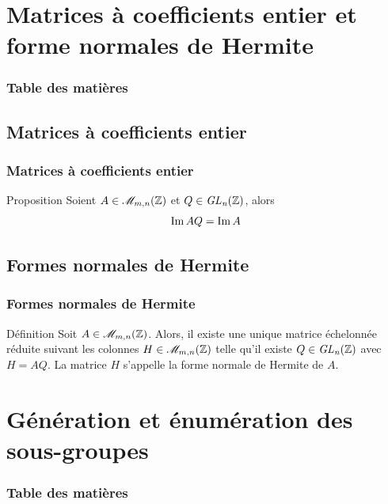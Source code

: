 \documentclass[10pt]{beamer}
\begin{document}
\section{Matrices à coefficients entier et forme normales de Hermite}
\begin{frame}
    \frametitle{Table des matières}
    \tableofcontents[currentsection]
\end{frame}


\subsection{Matrices à coefficients entier}
\begin{frame}
    \frametitle{Matrices à coefficients entier}

    \begin{block}{Proposition}
        Soient $A \in \mathscr{M}_{m,n}(\mathbb Z)$ et $Q \in \it {GL}_n(\mathbb Z)$, alors
        $$\operatorname{Im} AQ = \operatorname{Im} A$$
    \end{block}
\end{frame}


\subsection{Formes normales de Hermite}
\begin{frame}
    \frametitle{Formes normales de Hermite}
    \begin{alertblock}{Définition}
        Soit $A \in \mathscr{M}_{m,n}(\mathbb Z)$. Alors, il existe une unique matrice échelonnée
        réduite suivant les colonnes $H \in \mathscr{M}_{m,n}(\mathbb Z)$ telle qu'il existe $Q \in \it {GL}_n(\mathbb Z)$
        avec $H = AQ$. La matrice $H$ s'appelle la forme normale de Hermite de $A$.
    \end{alertblock}
\end{frame}


\section{Génération et énumération des sous-groupes}
\begin{frame}
    \frametitle{Table des matières}
    \tableofcontents[currentsection]
\end{frame}
\end{document}
